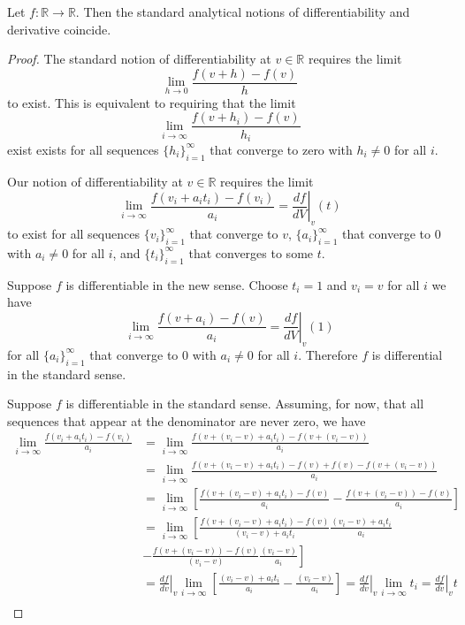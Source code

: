 \documentclass[11pt,letterpaper,fleqn]{memoir}
\begin{document}
\begin{prop}
	Let $f:\mathbb{R} \to \mathbb{R}$. Then the standard analytical notions of differentiability and derivative coincide.
\end{prop}
\begin{proof}
	The standard notion of differentiability at $v \in \mathbb{R}$ requires the limit
	$$ \lim\limits_{h \to 0} \frac{f(v + h) - f(v)}{h} $$
	to exist. This is equivalent to requiring that the limit
	$$ \lim\limits_{i \to \infty} \frac{f(v + h_i) - f(v)}{h_i} $$
	exist exists for all sequences $\{h_i\}_{i=1}^{\infty}$ that converge to zero with $h_i \neq 0$ for all $i$.
	
	Our notion of differentiability at $v \in \mathbb{R}$ requires the limit
	$$ \lim\limits_{i \to \infty} \frac{f(v_i + a_i t_i) - f(v_i)}{a_i} = \left.\frac{df}{dV} \right|_{v} (t)$$
	to exist for all sequences $\{v_i\}_{i=1}^{\infty}$ that converge to $v$, $\{a_i\}_{i=1}^{\infty}$ that converge to $0$ with $a_i \neq 0$ for all $i$, and $\{t_i\}_{i=1}^{\infty}$ that converges to some $t$.
	
	Suppose $f$ is differentiable in the new sense. Choose $t_i = 1$ and $v_i = v$ for all $i$ we have
	$$ \lim\limits_{i \to \infty} \frac{f(v + a_i) - f(v)}{a_i} = \left.\frac{df}{dV} \right|_{v} (1)$$
	for all $\{a_i\}_{i=1}^{\infty}$ that converge to $0$ with $a_i \neq 0$ for all $i$. Therefore $f$ is differential in the standard sense.
	
	Suppose $f$ is differentiable in the standard sense. Assuming, for now, that all sequences that appear at the denominator are never zero, we have
	\begin{align*}
	\lim\limits_{i \to \infty} \frac{f(v_i + a_i t_i) - f(v_i)}{a_i} &= \lim\limits_{i \to \infty} \frac{f(v + (v_i - v) + a_i t_i) - f(v + (v_i - v))}{a_i} \\
	&= \lim\limits_{i \to \infty} \frac{f(v + (v_i - v) + a_i t_i) - f(v) + f(v) - f(v + (v_i - v))}{a_i} \\
	&= \lim\limits_{i \to \infty} \left[\frac{f(v + (v_i - v) + a_i t_i) - f(v)}{a_i}
	- \frac{f(v + (v_i - v)) - f(v)}{a_i} \right]\\
	&= \lim\limits_{i \to \infty} \left[ \frac{f(v + (v_i - v) + a_i t_i) - f(v)}{(v_i - v) + a_i t_i} \frac{(v_i - v) + a_i t_i}{a_i} \right. \\
	&- \left.\frac{f(v + (v_i - v)) - f(v)}{(v_i - v)}  \frac{(v_i - v)}{a_i} \right] \\
	&=  \left.\frac{df}{dv} \right|_{v} \lim\limits_{i \to \infty} \left[ \frac{(v_i - v) + a_i t_i}{a_i} -  \frac{(v_i - v)}{a_i}\right] = \left.\frac{df}{dv} \right|_{v} \lim\limits_{i \to \infty} t_i = \left.\frac{df}{dv} \right|_{v} t \\
	\end{align*}
\end{proof}
\end{document}
